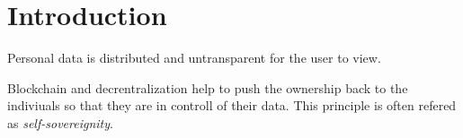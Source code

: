 \chapter{Introduction}
\label{cha:introduction}

Personal data is distributed and untransparent for the user to view.\cite[p. 1]{uPortWhitePaper}

Blockchain and decrentralization help to push the ownership back to the indiviuals so that they are in controll of their data. This principle is often refered as \textit{self-sovereignity}.\cite[p. 1]{uPortWhitePaper}


